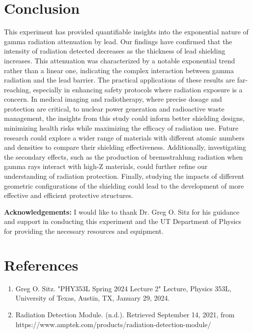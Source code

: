 \documentclass[12pt]{article}
\begin{document}
\section{Conclusion}
    This experiment has provided quantifiable insights into the exponential nature of gamma radiation attenuation by lead. 
    Our findings have confirmed that the intensity of radiation detected decreases as the thickness of lead shielding 
    increases. This attenuation was characterized by a notable exponential trend rather than a linear one, indicating 
    the complex interaction between gamma radiation and the lead barrier. The practical applications of these results 
    are far-reaching, especially in enhancing safety protocols where radiation exposure is a concern. In medical imaging 
    and radiotherapy, where precise dosage and protection are critical, to nuclear power generation and radioactive waste 
    management, the insights from this study could inform better shielding designs, minimizing health risks while 
    maximizing the efficacy of radiation use. Future research could explore a wider range of materials with different 
    atomic numbers and densities to compare their shielding effectiveness. Additionally, investigating the secondary 
    effects, such as the production of bremsstrahlung radiation when gamma rays interact with high-Z materials, could 
    further refine our understanding of radiation protection. Finally, studying the impacts of different geometric 
    configurations of the shielding could lead to the development of more effective and efficient protective structures.
        
    \textbf{Acknowledgements:} I would like to thank Dr. Greg O. Sitz for his guidance and support in conducting this experiment and the UT Department of Physics for providing the necessary resources and equipment.


\section{References}
    \begin{enumerate}
        \item Greg O. Sitz. "PHY353L Spring 2024 Lecture 2" Lecture, Physics 353L, University of Texas, Austin, TX, January 29, 2024.
        \item Radiation Detection Module. (n.d.). Retrieved September 14, 2021, from https://www.amptek.com/products/radiation-detection-module/
    \end{enumerate}
\end{document}
